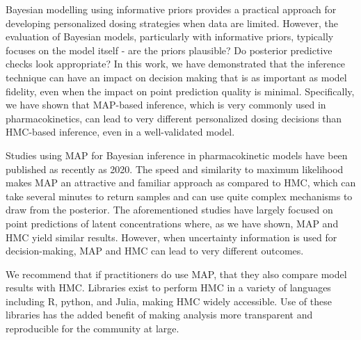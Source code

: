 Bayesian modelling using informative priors provides a practical approach for developing personalized dosing strategies when data are limited. However, the evaluation of Bayesian models, particularly with informative priors, typically focuses on the model itself - are the priors plausible? Do posterior predictive checks look appropriate? In this work, we have demonstrated that the inference technique can have an impact on decision making that is as important as model fidelity, even when the impact on point prediction quality is minimal. Specifically, we have shown that MAP-based inference, which is very commonly used in pharmacokinetics, can lead to very different personalized dosing decisions than HMC-based inference, even in a well-validated model.

Studies using MAP for Bayesian inference in pharmacokinetic models have been published as recently as 2020.  The speed and similarity to maximum likelihood makes MAP an attractive and familiar approach as compared to HMC, which can take several minutes to return samples and can use quite complex mechanisms to draw from the posterior. The aforementioned studies have largely focused on point predictions of latent concentrations where, as we have shown, MAP and HMC yield similar results. However, when uncertainty information is used for decision-making, MAP and HMC can lead to very different outcomes.

We recommend that if practitioners do use MAP, that they also compare model results with HMC.  Libraries exist to perform HMC in a variety of languages including R, python, and Julia, making HMC widely accessible.  Use of these libraries has the added benefit of making analysis more transparent and reproducible for the community at large.

